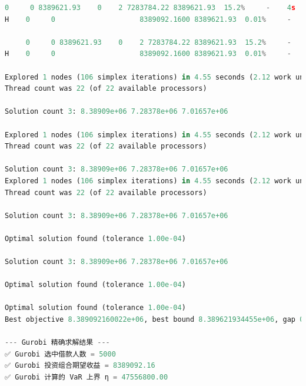 \documentclass[12pt,nonblindrev]{write_paper}
\begin{document}
\begin{lstlisting}[language=python]
     0     0 8389621.93    0    2 7283784.22 8389621.93  15.2%     -    4s
H    0     0                    8389092.1600 8389621.93  0.01%     -    4s

     0     0 8389621.93    0    2 7283784.22 8389621.93  15.2%     -    4s
H    0     0                    8389092.1600 8389621.93  0.01%     -    4s

Explored 1 nodes (106 simplex iterations) in 4.55 seconds (2.12 work units)
Thread count was 22 (of 22 available processors)

Solution count 3: 8.38909e+06 7.28378e+06 7.01657e+06

Explored 1 nodes (106 simplex iterations) in 4.55 seconds (2.12 work units)
Thread count was 22 (of 22 available processors)

Solution count 3: 8.38909e+06 7.28378e+06 7.01657e+06
Explored 1 nodes (106 simplex iterations) in 4.55 seconds (2.12 work units)
Thread count was 22 (of 22 available processors)

Solution count 3: 8.38909e+06 7.28378e+06 7.01657e+06

Optimal solution found (tolerance 1.00e-04)

Solution count 3: 8.38909e+06 7.28378e+06 7.01657e+06

Optimal solution found (tolerance 1.00e-04)

Optimal solution found (tolerance 1.00e-04)
Best objective 8.389092160022e+06, best bound 8.389621934455e+06, gap 0.0063%

--- Gurobi 精确求解结果 ---
✅ Gurobi 选中借款人数 = 5000
✅ Gurobi 投资组合期望收益 = 8389092.16
✅ Gurobi 计算的 VaR 上界 η = 47556800.00
\end{lstlisting}
\end{document}
